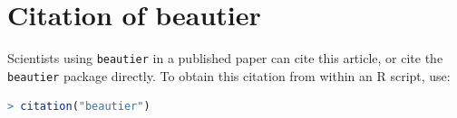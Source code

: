 \documentclass{article}
\begin{document}
\section{Citation of beautier}

Scientists using \verb;beautier; in a published paper can cite this
article, or cite the \verb;beautier; package 
directly. To obtain this citation from within an R script, use:

\begin{lstlisting}[language=R]
> citation("beautier")
\end{lstlisting}




\begin{thebibliography}{}

\end{thebibliography}
\end{document}
